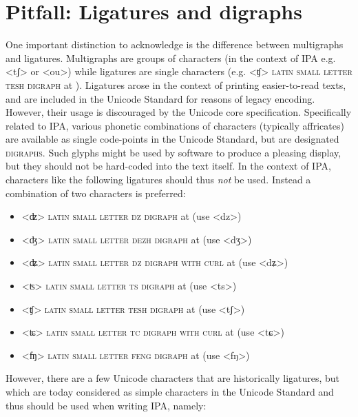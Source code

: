 \section{Pitfall: Ligatures and digraphs}
\label{pitfall-ligatures-digraphs}     

One important distinction to acknowledge is the difference between multigraphs
and ligatures. Multigraphs are groups of characters (in the context of IPA e.g.
<tʃ> or <ou>) while ligatures are single characters (e.g. <ʧ> \textsc{latin
small letter tesh digraph} at ). Ligatures arose in the context of
printing easier-to-read texts, and are included in the Unicode Standard for
reasons of legacy encoding. However, their usage is discouraged by the Unicode
core specification. Specifically related to IPA, various phonetic combinations
of characters (typically affricates) are available as single code-points in the
Unicode Standard, but are designated \textsc{digraphs}. Such glyphs might be used by
software to produce a pleasing display, but they should not be hard-coded into
the text itself. In the context of IPA, characters like the following ligatures
should thus \emph{not} be used. Instead a combination of two characters is
preferred:
      
\begin{itemize} 
	\item[] <ʣ> \textsc{latin small letter dz digraph} at  
	  (use <dz>) 
    \item[] <ʤ> \textsc{latin small letter dezh digraph} at 
      (use <dʒ>)
    \item[] <ʥ> \textsc{latin small letter dz digraph with curl} at 
      (use <dʑ>)
    \item[] <ʦ> \textsc{latin small letter ts digraph} at  
      (use <ts>)
	\item[] <ʧ> \textsc{latin small letter tesh digraph} at  
	  (use <tʃ>) 
    \item[] <ʨ> \textsc{latin small letter tc digraph with curl} at 
      (use <tɕ>)
   	\item[] <ʩ> \textsc{latin small letter feng digraph} at 
	  (use <fŋ>) 
\end{itemize}

However, there are a few Unicode characters that are historically ligatures, but
which are today considered as simple characters in the Unicode Standard and thus
should be used when writing IPA, namely:

